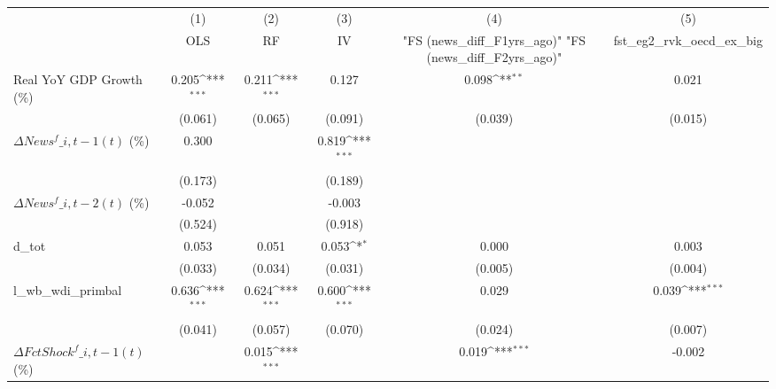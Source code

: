 {
\def\sym#1{\ifmmode^{#1}\else\(^{#1}\)\fi}
\begin{tabular}{l*{5}{c}}
\toprule
                    &\multicolumn{1}{c}{(1)}&\multicolumn{1}{c}{(2)}&\multicolumn{1}{c}{(3)}&\multicolumn{1}{c}{(4)}&\multicolumn{1}{c}{(5)}\\
                    &\multicolumn{1}{c}{OLS}&\multicolumn{1}{c}{RF}&\multicolumn{1}{c}{IV}&\multicolumn{1}{c}{ "FS (news\_diff\_F1yrs\_ago)"  "FS (news\_diff\_F2yrs\_ago)" }&\multicolumn{1}{c}{fst\_eg2\_rvk\_oecd\_ex\_big}\\
\midrule
Real YoY GDP Growth (\%)&       0.205\sym{***}&       0.211\sym{***}&       0.127         &       0.098\sym{**} &       0.021         \\
                    &     (0.061)         &     (0.065)         &     (0.091)         &     (0.039)         &     (0.015)         \\
\addlinespace
$ \Delta News^f\_{i,t-1}(t)$ (\%)&       0.300         &                     &       0.819\sym{***}&                     &                     \\
                    &     (0.173)         &                     &     (0.189)         &                     &                     \\
\addlinespace
$ \Delta News^f\_{i,t-2}(t)$ (\%)&      -0.052         &                     &      -0.003         &                     &                     \\
                    &     (0.524)         &                     &     (0.918)         &                     &                     \\
\addlinespace
d\_tot               &       0.053         &       0.051         &       0.053\sym{*}  &       0.000         &       0.003         \\
                    &     (0.033)         &     (0.034)         &     (0.031)         &     (0.005)         &     (0.004)         \\
\addlinespace
l\_wb\_wdi\_primbal    &       0.636\sym{***}&       0.624\sym{***}&       0.600\sym{***}&       0.029         &       0.039\sym{***}\\
                    &     (0.041)         &     (0.057)         &     (0.070)         &     (0.024)         &     (0.007)         \\
\addlinespace
$ \Delta FctShock^f\_{i,t-1}(t)$ (\%)&                     &       0.015\sym{***}&                     &       0.019\sym{***}&      -0.002         \\

\end{tabular}}
